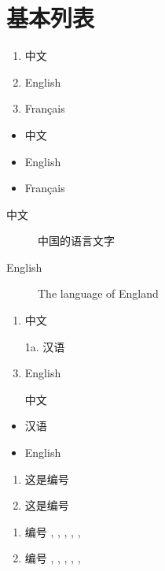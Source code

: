 \documentclass{report}
\begin{document}
	\tableofcontents
	
	\chapter{基本列表}
	\begin{enumerate} %
		\item 中文
		\item English
		\item Fran\c cais
	\end{enumerate}
	
	\begin{itemize} %
		\item 中文
		\item English
		\item Fran\c cais
	\end{itemize}
	
	\begin{description} %
		\item[中文] 中国的语言文字
		\item[English] The language of England
	\end{description}
	
	\begin{enumerate}
		\item 中文
		\item[1a.] 汉语
		\item English 
	\end{enumerate}
	
	\begin{itemize}
		\item[\dag] 中文
		\item 汉语
		\item English 
	\end{itemize}
	
	
	\begin{enumerate}
		\item 这是编号 \theenumi
		\item 这是编号 \theenumi
	\end{enumerate}
	
	\begin{enumerate}
		\item 编号 , , , , , 
		
		\item 编号 , , , , , 
	\end{enumerate}
	
\end{document}
